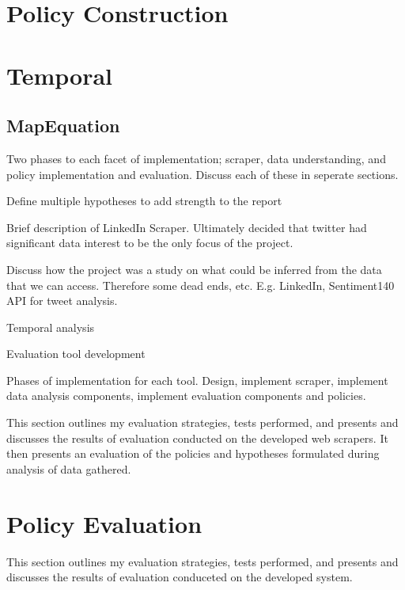 \section{Policy Construction}

\section{Temporal}

\subsection{MapEquation}

Two phases to each facet of implementation; scraper, data understanding, and policy implementation and evaluation. Discuss each of these in seperate sections.

Define multiple hypotheses to add strength to the report

Brief description of LinkedIn Scraper. Ultimately decided that twitter had significant data interest to be the only focus of the project.

Discuss how the project was a study on what could be inferred from the data that we can access. Therefore some dead ends, etc. E.g. LinkedIn, Sentiment140 API for tweet analysis. 

Temporal analysis

Evaluation tool development

Phases of implementation for each tool. Design, implement scraper, implement data analysis components, implement evaluation components and policies. 

This section outlines my evaluation strategies, tests performed, and presents and discusses the results of evaluation conducted on the developed web scrapers. It then presents an evaluation of the policies and hypotheses formulated during analysis of data gathered. 






\section{Policy Evaluation}

This section outlines my evaluation strategies, tests performed, and presents and discusses the results of evaluation conduceted on the developed system. 

